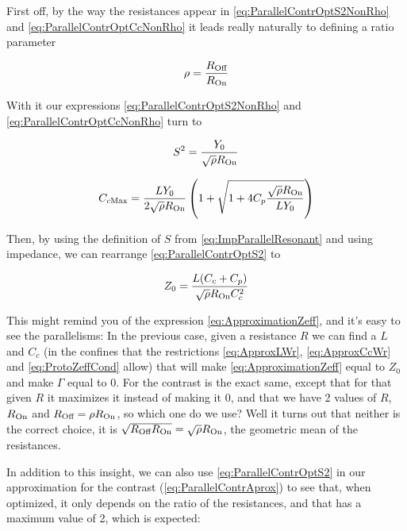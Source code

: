 \documentclass[../main.tex]{subfiles}
\begin{document}
First off, by the way the resistances appear in \ref{eq:ParallelContrOptS2NonRho}
and \ref{eq:ParallelContrOptCcNonRho} it leads really naturally to defining
a ratio parameter

\begin{equation}
\label{eq:RhoDef}
    \rho = \frac{R_{\text{Off}}}{R_{\text{On}}}
\end{equation}

With it our expressions \ref{eq:ParallelContrOptS2NonRho} and
\ref{eq:ParallelContrOptCcNonRho} turn to

\begin{equation}
\label{eq:ParallelContrOptS2}
    S^2 = \frac{Y_{0}}{\sqrt{\rho}R_{\text{On}}}
\end{equation}

\begin{equation}
\label{eq:ParallelContrOptCc}
C_{c\text{Max}} = \frac{L Y_{0}}{2\sqrt{\rho}R_{\text{On}}}
\left(1 + \sqrt{1 + 4C_{p}\frac{\sqrt{\rho}R_{\text{On}}}{LY_{0}}}\right)
\end{equation}

Then, by using the definition of \(S\) from \ref{eq:ImpParallelResonant} and
using impedance, we can rearrange \ref{eq:ParallelContrOptS2} to

\begin{equation}
\label{eq:ParallelTunning}
Z_{0} = \frac{L(C_{c}+C_{p})}{\sqrt{\rho}R_{\text{On}} C_{c}^2}
\end{equation}

This might remind you of the expression \ref{eq:ApproximationZeff}, and it's
easy to see the parallelisms: In the previous case, given a resistance \(R\) we
can find a \(L\) and \(C_{c}\) (in the confines that the restrictions
\ref{eq:ApproxLWr}, \ref{eq:ApproxCcWr} and \ref{eq:ProtoZeffCond} allow)
that will make \ref{eq:ApproximationZeff} equal to \(Z_{0}\) and make \(\Gamma\)
equal to \(0\). For the contrast is the exact same, except that for that given
\(R\) it maximizes it instead of making it \(0\), and that we have 2 values
of \(R\), \(R_{\text{On}}\) and \(R_{\text{Off}} = \rho R_{\text{On}}\), so
which one do we use? Well it turns out that neither is the correct choice,
it is \(\sqrt{R_{\text{Off}}R_{\text{On}}} = \sqrt{\rho}R_{\text{On}}\),
the geometric mean of the resistances.

In addition to this insight, we can also use \ref{eq:ParallelContrOptS2} in
our approximation for the contrast (\ref{eq:ParallelContrAprox}) to see
that, when optimized, it only depends on the ratio of the resistances, and
that has a maximum value of 2, which is expected:
\end{document}
